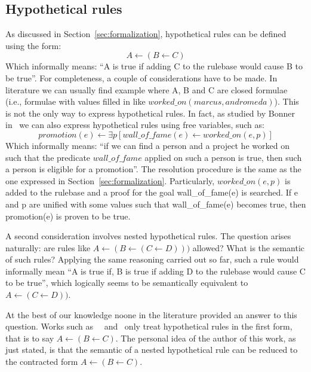 \begin{appendices}
  \section{Hypothetical rules}
  \label{app:hyr}
  As discussed in Section~\ref{sec:formalization}, hypothetical rules can be defined
  using the form:
  \begin{equation}
    A \leftarrow (B \leftarrow C)
  \end{equation}
  Which informally means: ``A is true if adding C to the rulebase would cause B to be true''.
  For completeness, a couple of considerations have to be made.
  In literature we can usually find example where A, B and C are closed formulae
  (i.e., formulae with values filled in like $worked\_on(marcus, andromeda)$). This
  is not the only way to express hypothetical rules.
  In fact, as studied by Bonner in~\cite{Bonner88alogic} we can also express
  hypothetical rules using free variables, such as:
  \begin{equation}
    promotion(e) \leftarrow \exists p [wall\_of\_fame(e) \leftarrow worked\_on(e, p)]
  \end{equation}
  Which informally means: ``if we can find a person and a project he worked on such that the
  predicate $wall\_of\_fame$ applied on such a person is true, then such a person
  is eligible for a promotion''. The resolution procedure is the same as the one expressed
  in Section~\ref{sec:formalization}. Particularly, $worked\_on(e,p)$ is added
  to the rulebase and a proof for the goal wall\_of\_fame(e) is searched.
  If e and p are unified with some values such that wall\_of\_fame(e) becomes true, then
  promotion(e) is proven to be true.

  A second consideration involves nested hypothetical rules. The question arises naturally:
  are rules like $A \leftarrow (B \leftarrow (C \leftarrow D)))$ allowed? What
  is the semantic of such rules? Applying the same reasoning carried out so far,
  such a rule would informally mean ``A is true if, B is true if adding D to the rulebase
  would cause C to be true'', which logically seems to be semantically equivalent to
  $A \leftarrow (C \leftarrow D))$.

  At the best of our knowledge noone in the literature provided an answer to this question.
  Works such as~\cite{Bonner88alogic}~\cite{Gabbay1984319}
  and~\cite{Bonner94hypotheticalreasoning} only treat hypothetical rules in the first
  form, that is to say $A \leftarrow (B \leftarrow C)$. The personal idea of the author
  of this work, as just stated, is that the semantic of a nested hypothetical rule
  can be reduced to the contracted form $A \leftarrow (B \leftarrow C)$.
\end{appendices}
